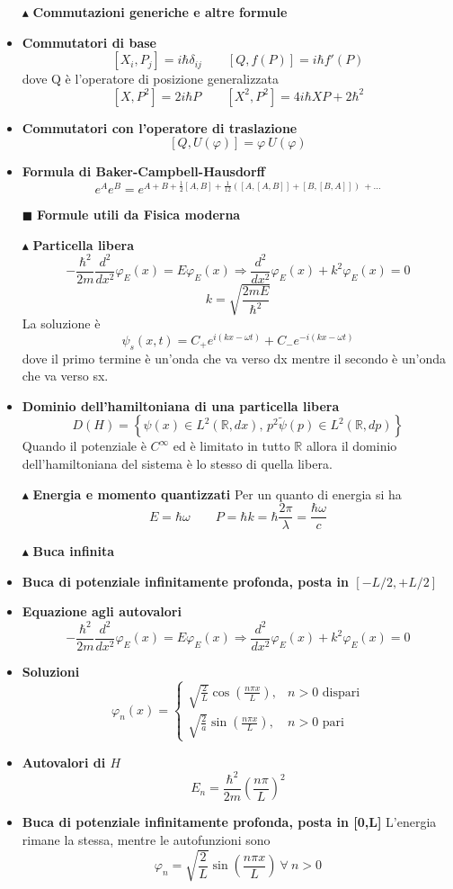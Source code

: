 \documentclass{book}
\newcommand{\g}{\textbf}
\newcommand{\e}{\begin{equation}}
\newcommand{\ex}{\end{equation} }
\renewcommand{\it}{\item[$\cdot$]}
\begin{document}
\begin{multicols}{4}
\begin{itemize}
  
\item [$\blacktriangle$] \g{Commutazioni generiche e altre formule}
    \it \g{Commutatori di base}
        \e{[X_i, P_j] = i\hbar\delta_{ij} \qquad [Q,f(P)] = i \hbar f'(P)}\ex
        dove Q è l'operatore di posizione generalizzata
        \e{[X, P^2] = 2i\hbar P \qquad [X^2, P^2] = 4i\hbar XP + 2\hbar^2} \ex
    \it \g{Commutatori con l'operatore di traslazione}
    \e{[Q, U(\varphi)] = \varphi \ U(\varphi)}\ex
    \it \g{Formula di Baker-Campbell-Hausdorff}
    \e{e^{A}e^{B} = e^{A + B + \frac{1}{2}[A, B] + \frac{1}{12}\left([A,[A,B]] + [B,[B,A]]\right)\ + \dots} }\ex
    
\item[$\blacksquare$] \g{Formule utili da Fisica moderna}
\item [$\blacktriangle$] \g{Particella libera }
 \e{-\frac{\hbar^2}{2m} \frac{d^2}{dx^2} \varphi_E(x) = E \varphi_E(x) \Rightarrow 
            \frac{d^2}{dx^2} \varphi_E(x) + k^2 \varphi_E(x) = 0} \ex
            \e{k = \sqrt{\frac{2mE}{\hbar^{2}}}
            }\ex
            La soluzione è
            \e{\psi_{s}(x,t) = C_{+}e^{i(kx - \omega t)} + C_{-}e^{-i(kx - \omega t)}}\ex
            dove il primo termine è un'onda che va verso dx mentre il secondo è un'onda che va verso sx.
    \it \g{Dominio dell’hamiltoniana di una particella libera}
        \e{D(H) = \left\{ \psi(x) \in L^2(\mathbb{R}, dx), \, p^2 \tilde{\psi}(p) \in L^2(\mathbb{R}, dp) \right\}} \ex
    Quando il potenziale è $C^\infty$ ed è limitato in tutto $\mathbb{R}$ allora il dominio dell’hamiltoniana del sistema è lo stesso di quella libera.
\item [$\blacktriangle$] \g{Energia e momento quantizzati}
Per un quanto di energia si ha
\e{E = \hbar \omega \qquad P = \hbar k = \hbar \frac{2 \pi}{\lambda} = \frac{ \hbar \omega}{c}}\ex
\item [$\blacktriangle$] \g{Buca infinita}
    \it \g{Buca di potenziale infinitamente profonda, posta in $[-L/2, +L/2]$}
        \it \g{Equazione agli autovalori}
            \e{-\frac{\hbar^2}{2m} \frac{d^2}{dx^2} \varphi_E(x) = E \varphi_E(x) \Rightarrow 
            \frac{d^2}{dx^2} \varphi_E(x) + k^2 \varphi_E(x) = 0} \ex
        \it \g{Soluzioni}
            \e{\varphi_n(x) = 
            \begin{cases} 
                \sqrt{\frac{2}{L}} \cos\left(\frac{n\pi x}{L}\right), & n > 0 \text{ dispari} \\
                \sqrt{\frac{2}{a}} \sin\left(\frac{n\pi x}{L}\right), & n > 0 \text{ pari}
            \end{cases}} \ex
        \it \g{Autovalori di $H$}
            \e{E_n = \frac{\hbar^2}{2m} \left(\frac{n\pi}{L}\right)^2} \ex
    \it \g{Buca di potenziale infinitamente profonda, posta in [0,L]}
    L'energia rimane la stessa, mentre le autofunzioni sono
    \e{\varphi_{n} = \sqrt{\frac{2}{L}}\sin(\frac{n \pi x}{L}) \ \forall \ n > 0}\ex
    

\end{itemize}
\end{multicols}
\end{document}
